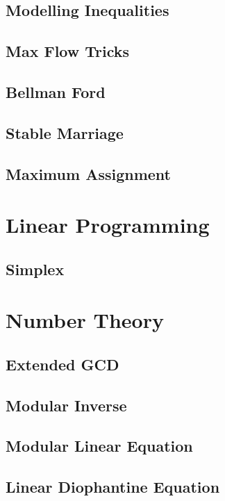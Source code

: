 \documentclass[twocolumn]{article}
\begin{document}
		\subsection{Modelling Inequalities}
			
		\subsection{Max Flow Tricks}
			
		\subsection{Bellman Ford}
			
		\subsection{Stable Marriage}
			
		\subsection{Maximum Assignment}
			
	\section{Linear Programming}
		\subsection{Simplex}
			
	\section{Number Theory}
		\subsection{Extended GCD}
			
		\subsection{Modular Inverse}
			
		\subsection{Modular Linear Equation}
			
		\subsection{Linear Diophantine Equation}
			
\end{document}

